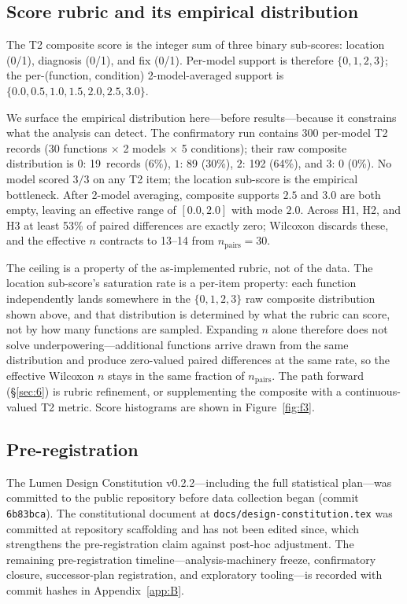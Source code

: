 \documentclass[11pt]{article}
\begin{document}
\subsection{Score rubric and its empirical distribution}
\label{sec:3.6}
The T2 composite score is the integer sum of three binary
sub-scores: location (0/1), diagnosis (0/1), and fix (0/1). Per-model
support is therefore $\{0,1,2,3\}$; the per-(function, condition)
2-model-averaged support is $\{0.0, 0.5, 1.0, 1.5, 2.0, 2.5, 3.0\}$.

We surface the empirical distribution here---before results---because
it constrains what the analysis can detect. The confirmatory run
contains 300 per-model T2 records ($30$ functions
$\times$ 2 models $\times$ 5 conditions); their raw composite
distribution is $0$: 19~records (6\%), $1$: 89 (30\%), $2$: 192
(64\%), and $3$: 0 (0\%).
No model scored $3/3$ on any T2 item; the location sub-score is the
empirical bottleneck. After 2-model averaging, composite supports
$2.5$ and $3.0$ are both empty, leaving an effective range of
$[0.0, 2.0]$ with mode $2.0$. Across H1, H2, and H3 at least 53\% of
paired differences are exactly zero; Wilcoxon discards these, and
the effective $n$ contracts to 13--14 from $n_{\text{pairs}} = 30$.

The ceiling is a property of the as-implemented rubric, not of the
data. The location sub-score's saturation rate is a per-item
property: each function independently lands somewhere in the
$\{0,1,2,3\}$ raw composite distribution shown above, and that
distribution is determined by what the rubric can score, not by
how many functions are sampled. Expanding $n$ alone therefore
does not solve underpowering---additional functions arrive
drawn from the same distribution and produce zero-valued paired
differences at the same rate, so the effective Wilcoxon $n$
stays in the same fraction of $n_{\text{pairs}}$. The path
forward (\S\ref{sec:6}) is rubric refinement, or supplementing
the composite with a continuous-valued T2 metric. Score
histograms are shown in Figure~\ref{fig:f3}.

\subsection{Pre-registration}
\label{sec:3.7}
The Lumen Design Constitution v0.2.2---including the full
statistical plan---was committed to the public repository before
data collection began (commit \texttt{6b83bca}). The constitutional
document at \texttt{docs/design-constitution.tex} was committed at
repository scaffolding and has not been edited since, which
strengthens the pre-registration claim against post-hoc adjustment.
The remaining pre-registration timeline---analysis-machinery freeze,
confirmatory closure, successor-plan registration, and exploratory
tooling---is recorded with commit hashes in Appendix~\ref{app:B}.
\end{document}

